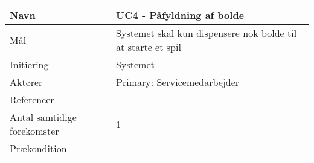 \documentclass[]{article}
\date{}
\begin{document}
{}

\protect\hypertarget{t.982baa266913794041029567659e3677b1ccea8f}{}{}\protect\hypertarget{t.0}{}{}

\begin{longtable}[]{@{}ll@{}}
\toprule
\toprule
\endhead
\begin{minipage}[t]{0.47\columnwidth}\raggedright
{Navn}\strut
\end{minipage} & \begin{minipage}[t]{0.47\columnwidth}\raggedright
{UC4 - Påfyldning af bolde}\strut
\end{minipage}\tabularnewline
\toprule
\begin{minipage}[t]{0.47\columnwidth}\raggedright
{Mål}\strut
\end{minipage} & \begin{minipage}[t]{0.47\columnwidth}\raggedright
{Systemet skal kun dispensere nok bolde til at starte et spil}\strut
\end{minipage}\tabularnewline
\toprule
\begin{minipage}[t]{0.47\columnwidth}\raggedright
{Initiering}\strut
\end{minipage} & \begin{minipage}[t]{0.47\columnwidth}\raggedright
{Systemet}\strut
\end{minipage}\tabularnewline
\toprule
\begin{minipage}[t]{0.47\columnwidth}\raggedright
{Aktører}\strut
\end{minipage} & \begin{minipage}[t]{0.47\columnwidth}\raggedright
{Primary: Servicemedarbejder}\strut
\end{minipage}\tabularnewline
\toprule
\begin{minipage}[t]{0.47\columnwidth}\raggedright
{Referencer}\strut
\end{minipage} & \begin{minipage}[t]{0.47\columnwidth}\raggedright
{}\strut
\end{minipage}\tabularnewline
\toprule
\begin{minipage}[t]{0.47\columnwidth}\raggedright
{Antal samtidige forekomster}\strut
\end{minipage} & \begin{minipage}[t]{0.47\columnwidth}\raggedright
{1}\strut
\end{minipage}\tabularnewline
\toprule
\begin{minipage}[t]{0.47\columnwidth}\raggedright
{Prækondition}\strut
\end{minipage} & \begin{minipage}[t]{0.47\columnwidth}\raggedright

\end{minipage}
\end{longtable}
\end{document}
